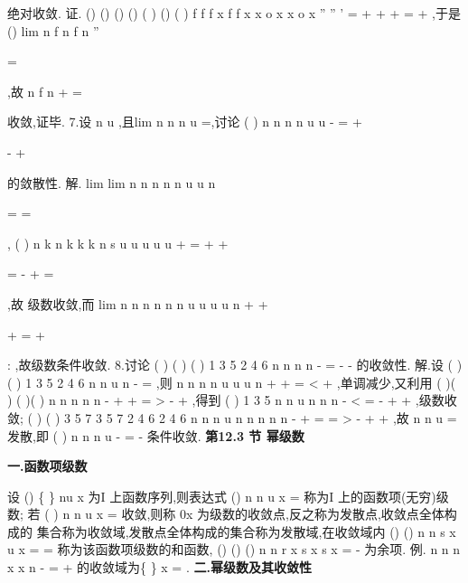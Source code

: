 \sum 
绝对收敛. 
证.
()
()
()
()
(
)
()
(
)
f
f
f x
f
f
x
x
o x
x
o x
''
''
'
=
+
+
+
=
+
,于是 
()
lim
n
f
n
f
n
\to \infty 
''

=




,故
n
f
n
+\infty 
=






\sum 
收敛,证毕. 
7.设
n
u \neq 
,且lim
n
n
n
u
\to \infty 
=,讨论
(
)
n
n
n
n
u
u
\infty 
-
=
+


-
+




\sum 
的敛散性. 
解.
lim
lim
n
n
n
n
n
u
u
n
\to \infty 
\to \infty 


=
\cdots 
=




,
(
)
n
k
n
k
k
k
n
s
u
u
u
u
u
+
=
+
+


=
-
+
=
\pm 
\to 




\sum 
,故 
级数收敛,而
lim
n
n
n
n
n
n u
u
u
u
n
\to \infty 
+
+


+
=
\Rightarrow 
+




:
,故级数条件收敛. 
8.讨论
(
)
(
)
(
)
1 3 5
2 4 6
n
n
n
n
\infty 
-
=
\cdots \cdots 
-
-
\cdots \cdots 
\sum 
\Lambda 
\Lambda 
的收敛性. 
解.设
(
)
(
)
1 3 5
2 4 6
n
n
u
n
\cdots \cdots 
-
=
\cdots \cdots 
\Lambda 
\Lambda 
,则
n
n
n
n
u
u
u
n
+
+
=
<
+
,单调减少,又利用 
(
)(
)
(
)(
)
n
n
n
n
n
-
+
+
=
>
-
+
,得到 
(
)
1 3 5
n
n
u
n
n
n
\cdots \cdots 
-
<
=
\to 
\cdots 
\cdots 
\cdots 
\cdots 
\cdots 
-\cdots 
+
+
\Lambda 
\Lambda 
,级数收敛; 
(
)
(
)
3 5 7
3 5 7
2 4 6
2 4 6
n
n
n
u
n
n
n
n
n
\cdots \cdots 
-
+
=
=
\cdots 
\cdots 
\cdots 
>
\cdots \cdots 
-
\cdots 
+
+
\Lambda 
\Lambda 
\Lambda 
,故
n
n
u
\infty 
=\sum 
发散,即 
(
)
n
n
n
u
\infty 
-
=
-
\sum 
条件收敛. 
\vspace{6pt}
{\large \bfseries \textcolor{lyred}{第12.3 节 幂级数}}

\vspace{4pt}
{\bfseries \textcolor{lyred}{一.函数项级数}}

设
()
\{
\}
nu
x
为I 上函数序列,则表达式
()
n
n
u
x
\infty 
=\sum 
称为I 上的\textcolor{lyred}{函数项(无穷)级数}; 
若
(
)
n
n
u
x
\infty 
=\sum 
收敛,则称
0x 为级数的\textcolor{lyred}{收敛点},反之称为\textcolor{lyred}{发散点},收敛点全体构成的 
集合称为\textcolor{lyred}{收敛域},发散点全体构成的集合称为\textcolor{lyred}{发散域},在收敛域内 
()
()
n
n
s x
u
x
\infty 
=
=\sum 
称为该函数项级数的\textcolor{lyred}{和函数},
()
()
()
n
n
r
x
s x
s
x
=
-
为\textcolor{lyred}{余项}. 
\textcolor{lyred}{例}.
n
n
n
x
x
n
-
\infty 
=
+
\sum 
的收敛域为\{
\}
x =\pm 
. 
\vspace{4pt}
{\bfseries \textcolor{lyred}{二.幂级数及其收敛性}}

